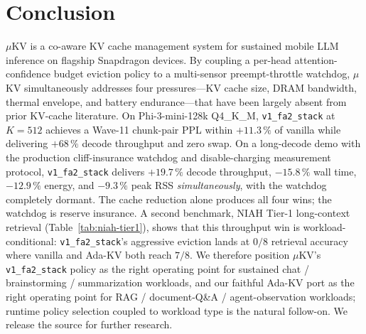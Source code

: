\documentclass[sigconf, anonymous=false, screen=true]{acmart}
\begin{document}
\section{Conclusion}
\label{sec:conclusion}

\textsc{$\mu$KV} is a co-aware KV cache management system for sustained mobile LLM inference on flagship Snapdragon devices. By coupling a per-head attention-confidence budget eviction policy to a multi-sensor preempt-throttle watchdog, \textsc{$\mu$KV} simultaneously addresses four pressures---KV cache size, DRAM bandwidth, thermal envelope, and battery endurance---that have been largely absent from prior KV-cache literature. On Phi-3-mini-128k Q4\_K\_M, \texttt{v1\_fa2\_stack} at $K{=}512$ achieves a Wave-11 chunk-pair PPL within $+11.3\,\%$ of vanilla while delivering $+68\,\%$ decode throughput and zero swap. On a long-decode demo with the production cliff-insurance watchdog and disable-charging measurement protocol, \texttt{v1\_fa2\_stack} delivers $+19.7\,\%$ decode throughput, $-15.8\,\%$ wall time, $-12.9\,\%$ energy, and $-9.3\,\%$ peak RSS \emph{simultaneously}, with the watchdog completely dormant. The cache reduction alone produces all four wins; the watchdog is reserve insurance. A second benchmark, NIAH Tier-1 long-context retrieval (Table~\ref{tab:niah-tier1}), shows that this throughput win is workload-conditional: \texttt{v1\_fa2\_stack}'s aggressive eviction lands at $0/8$ retrieval accuracy where vanilla and Ada-KV both reach $7/8$. We therefore position \textsc{$\mu$KV}'s \texttt{v1\_fa2\_stack} policy as the right operating point for sustained chat / brainstorming / summarization workloads, and our faithful Ada-KV port as the right operating point for RAG / document-Q\&A / agent-observation workloads; runtime policy selection coupled to workload type is the natural follow-on. We release the source for further research.
\end{document}

